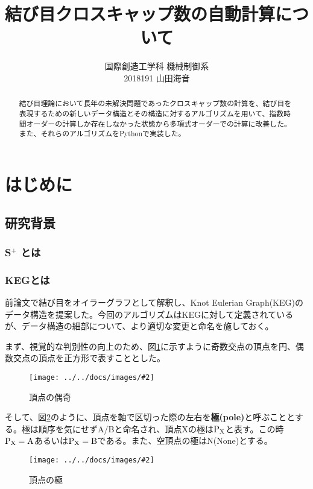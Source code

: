 \documentclass[11pt,a4j]{jarticle}
\title{結び目クロスキャップ数の自動計算について}
\author{国際創造工学科 機械制御系\\2018191 山田海音}
\date{} %
\newcommand{\splus}{S${}^\text{+}$}
\newcommand{\f}[1]{$\rm{#1}$} %
\newcommand{\image}[4][height=100pt]{%
\begin{figure}[htbp]
    \centering
    \texttt{[image: ../../docs/images/\#2]}
    \caption{#3}
    \label{fig:#4}
\end{figure}%
}
\newcommand{\tops}[2]{\texorpdfstring{#1}{#2}} %
\begin{document}
\maketitle
\vspace{30mm}
\begin{abstract}
結び目理論において長年の未解決問題であったクロスキャップ数の計算を、結び目を表現するための新しいデータ構造とその構造に対するアルゴリズムを用いて、指数時間オーダーの計算しか存在しなかった状態から多項式オーダーでの計算に改善した。また、それらのアルゴリズムをPythonで実装した。
\end{abstract}

\clearpage

\tableofcontents
\clearpage

\pagestyle{plain}
\lhead{\rightmark}

\section{はじめに}
\subsection{}
\subsection{研究背景}
\subsubsection{\tops{\splus}{splus} とは}
\subsubsection{KEGとは}
前論文\cite{keg}で結び目をオイラーグラフとして解釈し、Knot Eulerian Graph(KEG)のデータ構造を提案した。今回のアルゴリズムはKEGに対して定義されているが、データ構造の細部について、より適切な変更と命名を施しておく。

まず、視覚的な判別性の向上のため、図\ref{fig:parity}に示すように奇数交点の頂点を円、偶数交点の頂点を正方形で表すこととした。
\image{about_parity.jpg}{頂点の偶奇}{parity}

そして、図\ref{fig:pole}のように、頂点を軸で区切った際の左右を\textbf{極(pole)}と呼ぶこととする。極は順序を気にせずA/Bと命名され、頂点Xの極は\f{P_X}と表す。この時\f{P_X=A}あるいは\f{P_X=B}である。また、空頂点の極はN(None)とする。
\image[height=200pt]{about_pole.jpg}{頂点の極}{pole}
\end{document}
